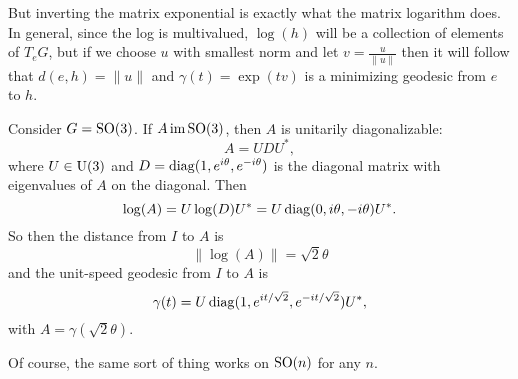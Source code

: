 But inverting the matrix exponential is exactly what the matrix logarithm does. In general, since the log is multivalued, $\log(h)$ will be a collection of elements of $T_eG$, but if we choose $u$ with smallest norm and let $v = \frac{u}{\|u\|}$ then it will follow that $d(e,h) = \|u\|$ and $\gamma(t) = \exp(tv)$ is a minimizing geodesic from $e$ to $h$.

\begin{example}
	Consider $G = \operatorname{SO}(3)$. If $A \operatorname{im} \operatorname{SO}(3)$, then $A$ is unitarily diagonalizable:
	\[
		A = U D U^\ast,
	\]
	where $U \in \operatorname{U}(3)$ and $D = \operatorname{diag}(1,e^{i\theta},e^{-i\theta})$ is the diagonal matrix with eigenvalues of $A$ on the diagonal. Then
	\[
		\log(A) = U \log(D) U^\ast = U \operatorname{diag}(0,i\theta,-i\theta) U^\ast.
	\]
	So then the distance from $I$ to $A$ is
	\[
		\|\log(A)\| = \sqrt{2}\theta
	\]
	and the unit-speed geodesic from $I$ to $A$ is
	\[
		\gamma(t) = U \operatorname{diag}(1,e^{it/\sqrt{2}},e^{-it/\sqrt{2}}) U^\ast,
	\]
	with $A = \gamma(\sqrt{2}\theta)$.
	
	Of course, the same sort of thing works on $\operatorname{SO}(n)$ for any $n$.
\end{example}


%
%
%
%

